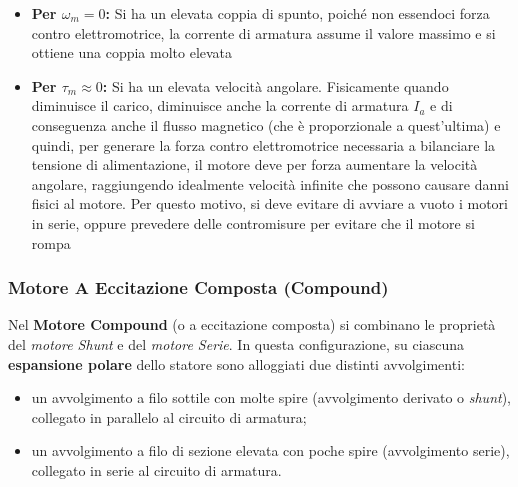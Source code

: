 ﻿\documentclass[11pt, a4paper]{article}
\begin{document}
\begin{itemize}
    \item \textbf{Per $\omega_m = 0$:} Si ha un elevata coppia di spunto, poiché non essendoci forza contro elettromotrice, la corrente di armatura assume il valore massimo e si ottiene una coppia molto elevata
    \item \textbf{Per $\tau_{m} \approx 0$:} Si ha un elevata velocità angolare. Fisicamente quando diminuisce il carico, diminuisce anche la corrente di armatura $I_a$ e di conseguenza anche il flusso magnetico (che è proporzionale a quest'ultima) e quindi, per generare la forza contro elettromotrice necessaria a bilanciare la tensione di alimentazione, il motore deve per forza aumentare la velocità angolare, raggiungendo idealmente velocità infinite che possono causare danni fisici al motore. Per questo motivo, si deve evitare di avviare a vuoto i motori in serie, oppure prevedere delle contromisure per evitare che il motore si rompa
\end{itemize}

\subsubsection{Motore A Eccitazione Composta (Compound)}
Nel \textbf{Motore Compound} (o a eccitazione composta) si combinano le proprietà del \textit{motore Shunt} e del \textit{motore Serie}. In questa configurazione, su ciascuna \textbf{espansione polare} dello statore sono alloggiati due distinti avvolgimenti:
\begin{itemize}
    \item un avvolgimento a filo sottile con molte spire (avvolgimento derivato o \textit{shunt}), collegato in parallelo al circuito di armatura;
    \item un avvolgimento a filo di sezione elevata con poche spire (avvolgimento serie), collegato in serie al circuito di armatura.
\end{itemize}
\end{document}
